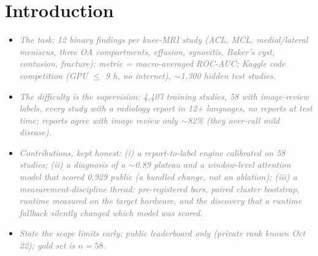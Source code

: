 \documentclass[conference]{IEEEtran}
\newcommand{\nt}[1]{\textcolor{gray}{\textit{#1}}}            %
\begin{document}
\section{Introduction}
\begin{notes}
\begin{itemize}
\item \nt{The task: 12 binary findings per knee-MRI study (ACL, MCL, medial/lateral meniscus, three OA compartments,
effusion, synovitis, Baker's cyst, contusion, fracture); metric = macro-averaged ROC-AUC; Kaggle code competition
(GPU $\le$ 9 h, no internet), $\sim$1,300 hidden test studies.}  %
\item \nt{The difficulty is the supervision: 4,407 training studies, 58 with image-review labels, every study with a
radiology report in 12+ languages, no reports at test time; reports agree with image review only $\sim$82\%
(they over-call mild disease).}  %
\item \nt{Contributions, kept honest: (i) a report-to-label engine calibrated on 58 studies; (ii) a diagnosis of a
$\sim$0.89 plateau and a window-level attention model that scored 0.929 public (a bundled change, not an ablation);
(iii) a measurement-discipline thread: pre-registered bars, paired cluster bootstrap, runtime measured on the target
hardware, and the discovery that a runtime fallback silently changed which model was scored.}
\item \nt{State the scope limits early: public leaderboard only (private rank known Oct 22); gold set is $n=58$.}
\end{itemize}
\end{notes}
\end{document}
